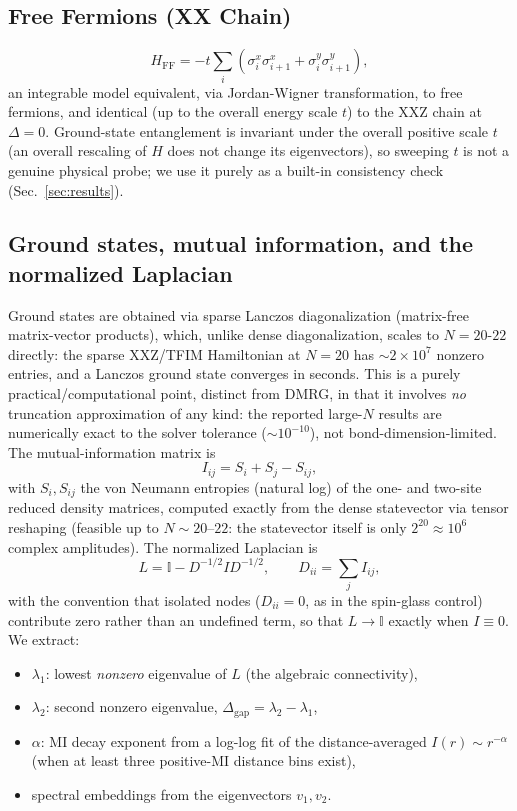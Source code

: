 \documentclass[aps,prx,reprint,amsmath,amssymb,superscriptaddress]{revtex4-2}
\begin{document}
\subsection{Free Fermions (XX Chain)}
\begin{equation}
H_{\mathrm{FF}} = -t \sum_{i}\left(\sigma_i^x \sigma_{i+1}^x + \sigma_i^y \sigma_{i+1}^y\right),
\end{equation}
an integrable model equivalent, via Jordan-Wigner transformation, to free fermions, and identical
(up to the overall energy scale $t$) to the XXZ chain at $\Delta=0$. Ground-state entanglement is
invariant under the overall positive scale $t$ (an overall rescaling of $H$ does not change its
eigenvectors), so sweeping $t$ is not a genuine physical probe; we use it purely as a built-in
consistency check (Sec.~\ref{sec:results}).

\subsection{Ground states, mutual information, and the normalized Laplacian}
Ground states are obtained via sparse Lanczos diagonalization (matrix-free matrix-vector products),
which, unlike dense diagonalization, scales to $N=20$-$22$ directly: the sparse XXZ/TFIM
Hamiltonian at $N=20$ has $\sim 2\times10^7$ nonzero entries, and a Lanczos ground state converges
in seconds. This is a purely practical/computational point, distinct from DMRG, in that it involves
\emph{no} truncation approximation of any kind: the reported large-$N$ results are numerically
exact to the solver tolerance ($\sim 10^{-10}$), not bond-dimension-limited. The mutual-information
matrix is
\begin{equation}
I_{ij} = S_i + S_j - S_{ij},
\end{equation}
with $S_i, S_{ij}$ the von Neumann entropies (natural log) of the one- and two-site reduced density
matrices, computed exactly from the dense statevector via tensor reshaping (feasible up to
$N\sim 20$--$22$: the statevector itself is only $2^{20}\approx 10^6$ complex amplitudes). The
normalized Laplacian is~\cite{vonLuxburg2007}
\begin{equation}
L = \mathbb{I} - D^{-1/2} I D^{-1/2}, \qquad D_{ii} = \sum_j I_{ij},
\end{equation}
with the convention that isolated nodes ($D_{ii}=0$, as in the spin-glass control) contribute zero
rather than an undefined term, so that $L\to\mathbb{I}$ exactly when $I\equiv 0$. We extract:
\begin{itemize}
    \item $\lambda_1$: lowest \emph{nonzero} eigenvalue of $L$ (the algebraic connectivity),
    \item $\lambda_2$: second nonzero eigenvalue, $\Delta_{\mathrm{gap}}=\lambda_2-\lambda_1$,
    \item $\alpha$: MI decay exponent from a log-log fit of the distance-averaged $I(r)\sim r^{-\alpha}$ (when at least three positive-MI distance bins exist),
    \item spectral embeddings from the eigenvectors $v_1,v_2$.
\end{itemize}
\end{document}
